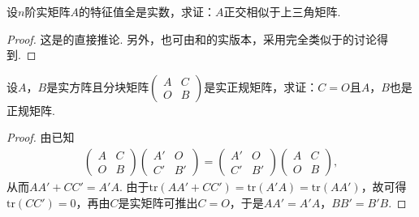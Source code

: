 \documentclass[../../main.tex]{subfiles}
\begin{document}
\begin{proposition}\label{proposition:例9.88}
设\(n\)阶实矩阵\(A\)的特征值全是实数，求证：\(A\)正交相似于上三角矩阵.
\end{proposition}
\begin{proof}
这是的直接推论. 另外，也可由和的实版本，采用完全类似于的讨论得到.

\end{proof}

\begin{proposition}\label{proposition:例9.89}
设\(A\)，\(B\)是实方阵且分块矩阵\(\begin{pmatrix}A&C\\O&B\end{pmatrix}\)是实正规矩阵，求证：\(C = O\)且\(A\)，\(B\)也是正规矩阵.
\end{proposition}
\begin{proof}
由已知
\begin{align*}
\begin{pmatrix}A&C\\O&B\end{pmatrix}\begin{pmatrix}A'&O\\C'&B'\end{pmatrix}=\begin{pmatrix}A'&O\\C'&B'\end{pmatrix}\begin{pmatrix}A&C\\O&B\end{pmatrix},
\end{align*}
从而\(AA'+CC' = A'A\). 由于\(\mathrm{tr}(AA'+CC')=\mathrm{tr}(A'A)=\mathrm{tr}(AA')\)，故可得\(\mathrm{tr}(CC') = 0\)，再由\(C\)是实矩阵可推出\(C = O\)，于是\(AA' = A'A\)，\(BB' = B'B\).

\end{proof}
\end{document}
